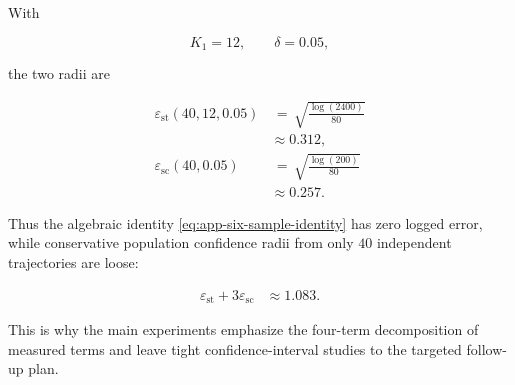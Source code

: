\documentclass{article} %
\begin{document}
With

\begin{equation}
\label{eq:app-six-estimator-example-Kdelta}
K_1=12,
\qquad
\delta=0.05,
\end{equation}

the two radii are

\begin{align}
\label{eq:app-six-estimator-example-radii}
\varepsilon_{\mathrm{st}}(40,12,0.05)
&\,=\,
\sqrt{\frac{\log(2400)}{80}}
\\
&\approx
0.312,
\\
\varepsilon_{\mathrm{sc}}(40,0.05)
&\,=\,
\sqrt{\frac{\log(200)}{80}}
\\
&\approx
0.257.
\end{align}

Thus the algebraic identity \eqref{eq:app-six-sample-identity} has zero logged error, while conservative population confidence radii from only \(40\) independent trajectories are loose:

\begin{align}
\label{eq:app-six-estimator-example-margin}
\varepsilon_{\mathrm{st}}+3\varepsilon_{\mathrm{sc}}
&\approx
1.083.
\end{align}

This is why the main experiments emphasize the four-term decomposition of measured terms and leave tight confidence-interval studies to the targeted follow-up plan.
\end{document}
